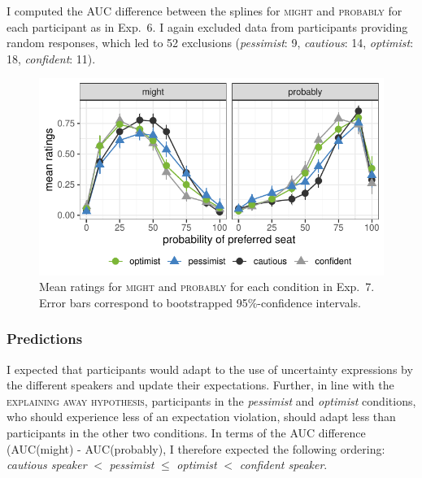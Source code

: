 I computed the AUC difference between the splines for  \textsc{might} and \textsc{probably} for each participant as in Exp.~6. I again excluded data from participants providing random responses, which led to 52 exclusions (\textit{pessimist}: 9, \textit{cautious}: 14, \textit{optimist}: 18, \textit{confident}: 11).

\begin{figure}[t]
    \centering
    \includegraphics[width=0.75\columnwidth, trim={0 0.75cm 0 0cm}]{./plots/explaining-away.pdf}
    \caption{Mean ratings for \textsc{might} and \textsc{probably} for each condition in Exp.~7. Error bars correspond to bootstrapped 95\%-confidence intervals.}
    \label{fig:results-exp7}
\end{figure}
\subsubsection{Predictions}

I expected that participants would adapt to the use of uncertainty expressions by the different speakers and update their expectations. Further, in line with the \textsc{explaining away hypothesis}, participants in the \textit{pessimist} and \textit{optimist} conditions, who should experience less of an expectation violation, should adapt less than participants in the other two conditions. In terms of the AUC difference (AUC(might) - AUC(probably), I therefore expected the following ordering: \textit{cautious speaker} $<$  \textit{pessimist} $\leq$ \textit{optimist} $<$ \textit{confident speaker}.

